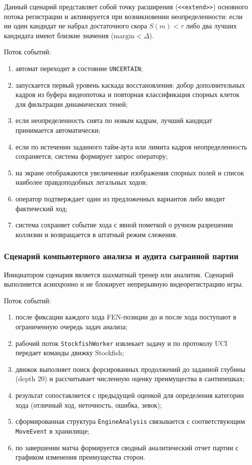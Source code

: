 Данный сценарий представляет собой точку расширения (\texttt{<<extend>>}) основного потока регистрации и активируется при возникновении неопределенности: если ни один кандидат не набрал достаточного скора $S(m) < \tau$ либо два лучших кандидата имеют близкие значения ($\text{margin} < \Delta$).

Поток событий:

\begin{enumerate}
    \item автомат переходит в состояние \texttt{UNCERTAIN};
    \item запускается первый уровень каскада восстановления: добор дополнительных кадров из буфера видеопотока и повторная классификация спорных клеток для фильтрации динамических теней;
    \item если неопределенность снята по новым кадрам, лучший кандидат принимается автоматически;
    \item если по истечении заданного тайм-аута или лимита кадров неопределенность сохраняется, система формирует запрос оператору;
    \item на экране отображаются увеличенные изображения спорных полей и список наиболее правдоподобных легальных ходов;
    \item оператор подтверждает один из предложенных вариантов либо вводит фактический ход;
    \item система сохраняет событие хода с явной пометкой о ручном разрешении коллизии и возвращается в штатный режим слежения.
\end{enumerate}

\subsubsection{Сценарий компьютерного анализа и аудита сыгранной партии}

Инициатором сценария является шахматный тренер или аналитик. Сценарий выполняется асинхронно и не блокирует непрерывную видеорегистрацию игры.

Поток событий:

\begin{enumerate}
    \item после фиксации каждого хода FEN-позиции до и после хода поступают в ограниченную очередь задач анализа;
    \item рабочий поток \texttt{StockfishWorker} извлекает задачу и по протоколу UCI передает команды движку Stockfish;
    \item движок выполняет поиск форсированных продолжений до заданной глубины (depth 20) и рассчитывает численную оценку преимущества в сантипешках;
    \item результат сопоставляется с предыдущей оценкой для определения категории хода (отличный ход, неточность, ошибка, зевок);
    \item сформированная структура \texttt{EngineAnalysis} связывается с соответствующим \texttt{MoveEvent} в хранилище;
    \item по завершении матча формируется сводный аналитический отчет партии с графиком изменения преимущества сторон.
\end{enumerate}

